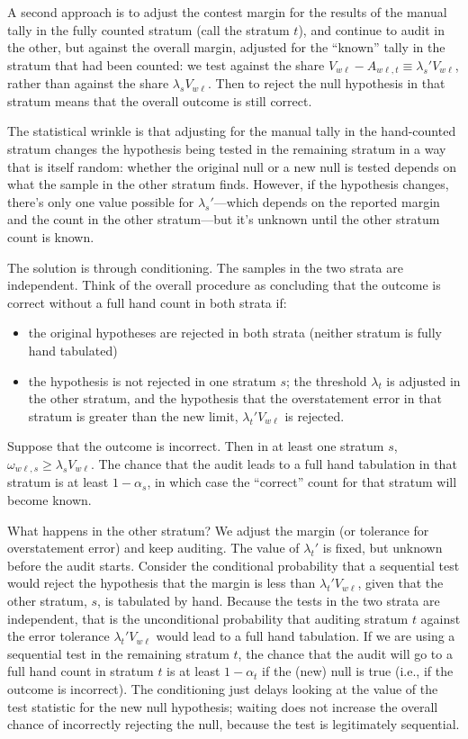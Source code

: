 A second approach is to adjust the contest margin for the results of the manual tally in the
fully counted stratum (call the stratum $t$), and continue to audit in the other, 
but against the overall margin, adjusted for the ``known'' tally in the stratum that had 
been counted: we test against the share $V_{w\ell} - A_{w\ell,t} \equiv \lambda_s' V_{w\ell}$, rather than 
against the share $\lambda_s V_{w\ell}$.
Then to reject the null hypothesis in that stratum means that the overall outcome is still correct.

The statistical wrinkle is that adjusting for the manual tally in the hand-counted stratum 
changes the hypothesis being tested in the remaining
stratum in a way that is itself random:
whether the original null or a new null is tested depends on what the sample in the other stratum
finds.
However, if the hypothesis changes, there's only one value possible for $\lambda_s'$---which
depends on the reported margin and the count in the other stratum---but it's unknown 
until the other stratum count is known.

The solution is through conditioning. 
The samples in the two strata are independent. 
Think of the overall procedure as concluding that the outcome is correct without a full
hand count in both strata if:

\begin{itemize}
   \item the original hypotheses are rejected in both strata (neither stratum is fully hand tabulated)
   \item the hypothesis is not rejected in one stratum $s$; the threshold $\lambda_t$
            is adjusted in the other stratum, and the hypothesis that the overstatement error
            in that stratum is greater than the new limit, $\lambda_t' V_{w\ell}$ is rejected. 
\end{itemize}

Suppose that the outcome is incorrect. 
Then in at least one stratum $s$, $\omega_{w\ell,s}\ge \lambda_s V_{w\ell}$.
The chance that the audit leads to a full hand tabulation in that stratum is at least $1-\alpha_s$,
in which case the ``correct'' count for that stratum will become known.

What happens in the other stratum?
We adjust the margin (or tolerance for overstatement error) and keep auditing.
The value of $\lambda_t'$ is fixed, but unknown before the audit starts.
Consider the conditional probability that a sequential test would reject the hypothesis that the margin is less than $\lambda_t' V_{w\ell}$, given that the other stratum, $s$, is tabulated by hand.
Because the tests in the two strata are independent, that is the unconditional probability
that auditing stratum $t$ against the error tolerance $\lambda_t' V_{w\ell}$ would lead to a full
hand tabulation. 
If we are using a sequential test in the remaining stratum $t$, the chance that the audit will
go to a full hand count in stratum $t$ is at least $1-\alpha_t$ if the (new) null is true (i.e.,
if the outcome is incorrect). 
The conditioning just delays looking at the value of the test statistic for the new null hypothesis; waiting does not increase the overall chance of incorrectly rejecting the null, 
because the test is legitimately sequential.

